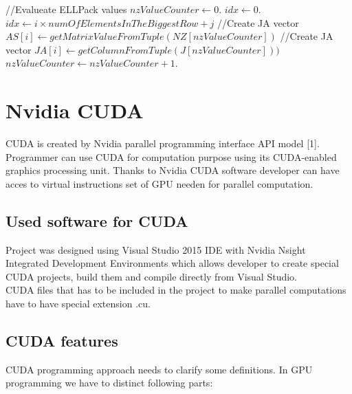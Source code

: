 \documentclass{scrreprt}
\begin{document}
\begin{algorithm}
\begin{algorithmic}[1]

\State //Evalueate ELLPack values
\State $nzValueCounter  \gets 0$.
\State $idx  \gets 0$.
        \State $idx \gets i \times numOfElementsInTheBiggestRow + j$
        \State //Create JA vector
          \State $AS[i] \gets getMatrixValueFromTuple(NZ[nzValueCounter])$
        \State //Create JA vector
         \State $JA[i] \gets getColumnFromTuple(J[nzValueCounter]))$
         \State $nzValueCounter \gets nzValueCounter+1$.
         \State

       \EndFor
      \EndFor

     \EndProcedure
\end{algorithmic}
\end{algorithm}
\FloatBarrier

\chapter{Nvidia CUDA}

CUDA is created by Nvidia parallel programming interface API model [1]. Programmer can use CUDA for computation purpose using its CUDA-enabled graphics processing unit. Thanks to Nvidia CUDA software developer can have acces to virtual instructions set of GPU needen for parallel computation.

\section{Used software for CUDA}
Project was designed using Visual Studio 2015 IDE with Nvidia Nsight Integrated Development Environments which allows developer to create special CUDA projects, build them and compile directly from Visual Studio.
\\
CUDA files that has to be included in the project to make parallel computations have to have special extension .cu.




\section{CUDA features}
CUDA programming approach needs to clarify some definitions. In GPU programming we have to distinct following parts:
\\
\end{document}
